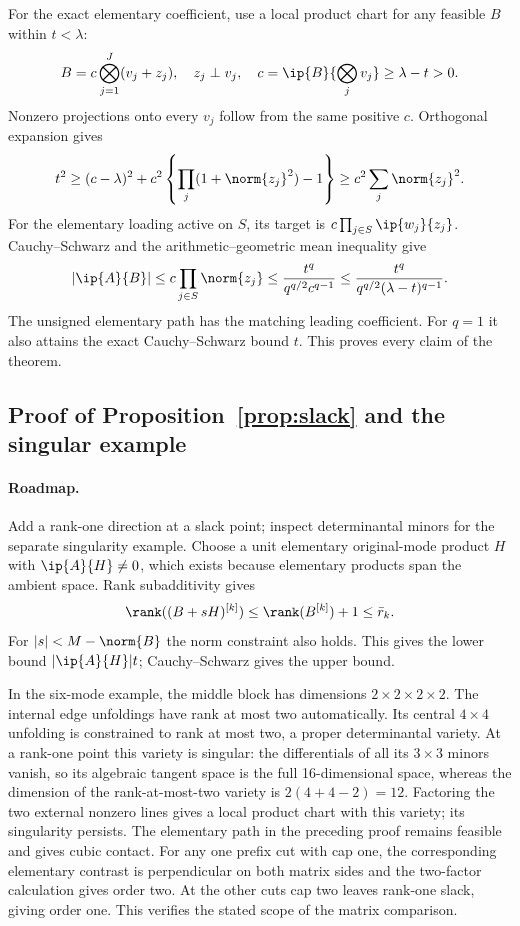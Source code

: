 For the exact elementary coefficient, use a local product chart for any feasible $B$ within $t<\lambda$:
\[
 B=c\bigotimes_{j=1}^J(v_j+z_j),\quad z_j\perp v_j,
 \quad c=\ip{B}{\bigotimes_jv_j}\ge\lambda-t>0.
\]
Nonzero projections onto every $v_j$ follow from the same positive $c$. Orthogonal expansion gives
\[
 t^2\ge(c-\lambda)^2+c^2\left\{\prod_j(1+\norm{z_j}^2)-1\right\}
 \ge c^2\sum_j\norm{z_j}^2.
\]
For the elementary loading active on $S$, its target is $c\prod_{j\in S}\ip{w_j}{z_j}$. Cauchy--Schwarz and the arithmetic--geometric mean inequality give
\[
 |\ip{A}{B}|\le c\prod_{j\in S}\norm{z_j}
 \le\frac{t^q}{q^{q/2}c^{q-1}}
 \le\frac{t^q}{q^{q/2}(\lambda-t)^{q-1}}.
\]
The unsigned elementary path has the matching leading coefficient. For $q=1$ it also attains the exact Cauchy--Schwarz bound $t$. This proves every claim of the theorem.

\subsection{Proof of Proposition~\ref{prop:slack} and the singular example}
\paragraph{Roadmap.} Add a rank-one direction at a slack point; inspect determinantal minors for the separate singularity example.
Choose a unit elementary original-mode product $H$ with $\ip{A}{H}\ne0$, which exists because elementary products span the ambient space. Rank subadditivity gives
\[
 \rank((B+sH)^{[k]})\le\rank(B^{[k]})+1\le\bar r_k.
\]
For $|s|<M-\norm{B}$ the norm constraint also holds. This gives the lower bound $|\ip{A}{H}|t$; Cauchy--Schwarz gives the upper bound.

In the six-mode example, the middle block has dimensions $2\times2\times2\times2$. The internal edge unfoldings have rank at most two automatically. Its central $4\times4$ unfolding is constrained to rank at most two, a proper determinantal variety. At a rank-one point this variety is singular: the differentials of all its $3\times3$ minors vanish, so its algebraic tangent space is the full 16-dimensional space, whereas the dimension of the rank-at-most-two variety is $2(4+4-2)=12$. Factoring the two external nonzero lines gives a local product chart with this variety; its singularity persists. The elementary path in the preceding proof remains feasible and gives cubic contact. For any one prefix cut with cap one, the corresponding elementary contrast is perpendicular on both matrix sides and the two-factor calculation gives order two. At the other cuts cap two leaves rank-one slack, giving order one. This verifies the stated scope of the matrix comparison.

